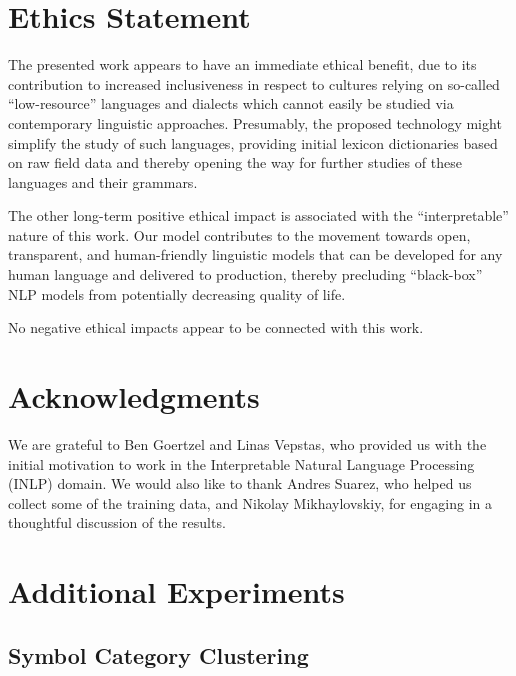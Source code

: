 \documentclass[11pt]{article}
\begin{document}
\section*{Ethics Statement}

The presented work appears to have an immediate ethical benefit, due to its contribution to increased inclusiveness in respect to cultures relying on so-called “low-resource” languages and dialects which cannot easily be studied via contemporary linguistic approaches. Presumably, the proposed technology might simplify the study of such languages, providing initial lexicon dictionaries based on raw field data and thereby opening the way for further studies of these languages and their grammars. 

The other long-term positive ethical impact is associated with the “interpretable” nature of this work. Our model contributes to the movement towards open, transparent, and human-friendly linguistic models that can be developed for any human language and delivered to production, thereby precluding “black-box” NLP models from potentially decreasing quality of life.

No negative ethical impacts appear to be connected with this work.   

\section*{Acknowledgments}

We are grateful to Ben Goertzel and Linas Vepstas, who provided us with the initial motivation to work in the Interpretable Natural Language Processing (INLP) domain. We would also like to thank Andres Suarez, who helped us collect some of the training data, and Nikolay Mikhaylovskiy, for engaging in a thoughtful discussion of the results.

\nocite{*}




\appendix

\section{Additional Experiments}

\subsection{Symbol Category Clustering}
\end{document}
